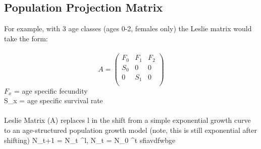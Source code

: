 \documentclass[12pt]{article}
\begin{document}
\subsection{ Population Projection Matrix}
For example, with 3 age classes (ages 0-2, females only) the Leslie matrix would take the form:\\\\
\begin{equation}
A= 
\begin{pmatrix}
F_{0} & F_{1} & F_{2} \\
S_{0} & 0 & 0 \\
0 & S_{1} & 0 \\
\end{pmatrix}

\end{equation}
\(F_x\) = age specific fecundity\\
S_x = age specific survival rate\\\\
Leslie Matrix (A) replaces l in the shift from a simple exponential growth curve to an age-structured population growth model (note, this is still exponential after shifting)
N_{t+1} = N_t \lambda^l, \quad N_t = N_0 \lambda^t
sfiavdfwbge
\end{document}
